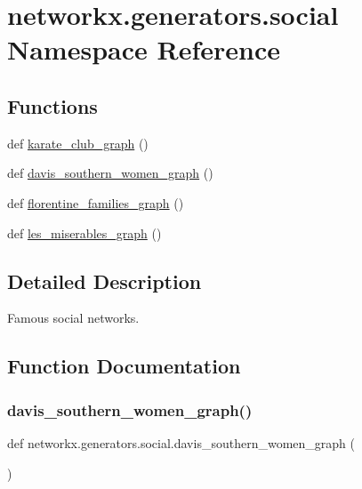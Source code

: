 \hypertarget{namespacenetworkx_1_1generators_1_1social}{}\section{networkx.\+generators.\+social Namespace Reference}
\label{namespacenetworkx_1_1generators_1_1social}
\subsection*{Functions}
\begin{DoxyCompactItemize}
\item 
def \hyperlink{namespacenetworkx_1_1generators_1_1social_a655d10aaddb72a9260bcfbc7d24f14dc}{karate\+\_\+club\+\_\+graph} ()
\item 
def \hyperlink{namespacenetworkx_1_1generators_1_1social_af5d22b38403f057802ddcd0a0302e93d}{davis\+\_\+southern\+\_\+women\+\_\+graph} ()
\item 
def \hyperlink{namespacenetworkx_1_1generators_1_1social_ad36dd0e3530c42e16740256a8aeee2fc}{florentine\+\_\+families\+\_\+graph} ()
\item 
def \hyperlink{namespacenetworkx_1_1generators_1_1social_a447c418a2427c4533b79b881c7453732}{les\+\_\+miserables\+\_\+graph} ()
\end{DoxyCompactItemize}


\subsection{Detailed Description}
\begin{DoxyVerb}Famous social networks.
\end{DoxyVerb}
 

\subsection{Function Documentation}
\mbox{\label{namespacenetworkx_1_1generators_1_1social_af5d22b38403f057802ddcd0a0302e93d}} 
\subsubsection{\texorpdfstring{davis\+\_\+southern\+\_\+women\+\_\+graph()}{davis\_southern\_women\_graph()}}
{\footnotesize\ttfamily def networkx.\+generators.\+social.\+davis\+\_\+southern\+\_\+women\+\_\+graph (\begin{DoxyParamCaption}{ }\end{DoxyParamCaption})}

